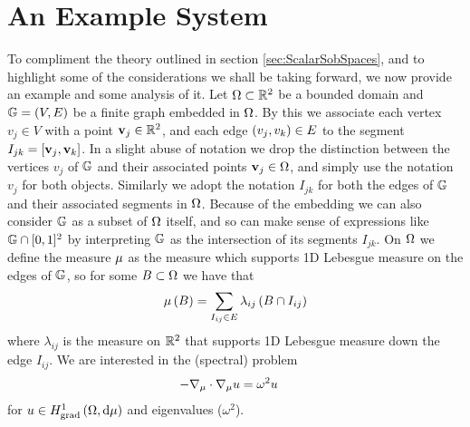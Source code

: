 \section{An Example System} \label{sec:ScalarExample}
To compliment the theory outlined in section \ref{sec:ScalarSobSpaces}, and to highlight some of the considerations we shall be taking forward, we now provide an example and some analysis of it.
Let $\Omega\subset\mathbb{R}^2$ be a bounded domain and $\mathbb{G} = \left( V,E \right)$ be a finite graph embedded in $\Omega$. 
By this we associate each vertex $v_j\in V$ with a point $\mathbf{v}_j\in\mathbb{R}^2$, and each edge $\left( v_j,v_k \right)\in E$ to the segment $I_{jk}=\left[ \mathbf{v}_j,\mathbf{v}_k \right]$.
In a slight abuse of notation we drop the distinction between the vertices $v_j$ of $\mathbb{G}$ and their associated points $\mathbf{v}_j\in\Omega$, and simply use the notation $v_j$ for both objects.
Similarly we adopt the notation $I_{jk}$ for both the edges of $\mathbb{G}$ and their associated segments in $\Omega$.
Because of the embedding we can also consider $\mathbb{G}$ as a subset of $\Omega$ itself, and so can make sense of expressions like $\mathbb{G}\cap[0,1]^2$ by interpreting $\mathbb{G}$ as the intersection of its segments $I_{jk}$. 
On $\Omega$ we define the measure $\mu$ as the measure which supports 1D Lebesgue measure on the edges of $\mathbb{G}$, so for some $B\subset\Omega$ we have that 
\begin{align*}
	\mu\left( B \right) = \sum_{I_{ij}\in E}\lambda_{ij}\left( B \cap I_{ij} \right)
\end{align*}
where $\lambda_{ij}$ is the measure on $\mathbb{R}^2$ that supports 1D Lebesgue measure down the edge $I_{ij}$. 
We are interested in the (spectral) problem
\begin{align} \label{eq:ScalarExampleStrongForm}
	-\nabla_\mu \cdot \nabla_\mu u &= \omega^2 u
\end{align}
for $u\in H^1_\mathrm{grad}\left( \Omega, \mathrm{d}\mu \right)$ and eigenvalues ($\omega^2$). \newline

